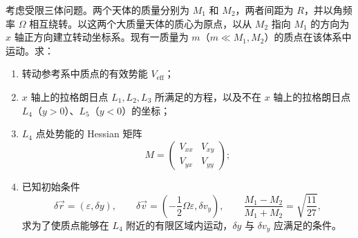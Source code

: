 \begin{question}[受限三体问题]
考虑受限三体问题。两个天体的质量分别为 $M_1$ 和 $M_2$，两者间距为 $R$，并以角频率 $\Omega$ 相互绕转。以这两个大质量天体的质心为原点，以从 $M_2$ 指向 $M_1$ 的方向为 $x$ 轴正方向建立转动坐标系。现有一质量为 $m$（$m\ll M_1,M_2$）的质点在该体系中运动。求：
\begin{enumerate}
  \item 转动参考系中质点的有效势能 $V_{\mathrm{eff}}$；
  \item $x$ 轴上的拉格朗日点 $L_1,L_2,L_3$ 所满足的方程，以及不在 $x$ 轴上的拉格朗日点 $L_4$（$y>0$）、$L_5$（$y<0$）的坐标；
  \item $L_4$ 点处势能的 Hessian 矩阵
  \[
    M=\begin{pmatrix}
      V_{xx}&V_{xy}\\
      V_{yx}&V_{yy}
    \end{pmatrix};
  \]
  \item 已知初始条件
  \[
    \delta\vec r=(\varepsilon,\delta y),\qquad
    \delta\vec v=\left(-\frac12\Omega\varepsilon,\delta v_y\right),\qquad
    \frac{M_1-M_2}{M_1+M_2}=\sqrt{\frac{11}{27}},
  \]
  求为了使质点能够在 $L_4$ 附近的有限区域内运动，$\delta y$ 与 $\delta v_y$ 应满足的条件。
\end{enumerate}


\end{question}
